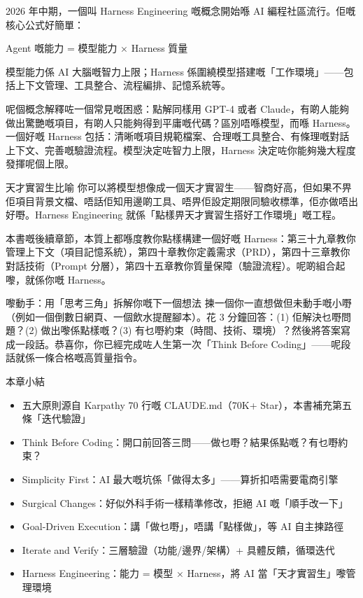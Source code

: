 
2026 年中期，一個叫 Harness Engineering 嘅概念開始喺 AI 編程社區流行。佢嘅核心公式好簡單：

Agent 嘅能力 = 模型能力 × Harness 質量

模型能力係 AI 大腦嘅智力上限；Harness 係圍繞模型搭建嘅「工作環境」——包括上下文管理、工具整合、流程編排、記憶系統等。

呢個概念解釋咗一個常見嘅困惑：點解同樣用 GPT-4 或者 Claude，有啲人能夠做出驚艷嘅項目，有啲人只能夠得到平庸嘅代碼？區別唔喺模型，而喺 Harness。一個好嘅 Harness 包括：清晰嘅項目規範檔案、合理嘅工具整合、有條理嘅對話上下文、完善嘅驗證流程。模型決定咗智力上限，Harness 決定咗你能夠幾大程度發揮呢個上限。

\begin{tcbinfo}{天才實習生比喻}
你可以將模型想像成一個天才實習生——智商好高，但如果不畀佢項目背景文檔、唔話佢知用邊啲工具、唔畀佢設定期限同驗收標準，佢亦做唔出好嘢。Harness Engineering 就係「點樣畀天才實習生搭好工作環境」嘅工程。

\end{tcbinfo}

本書嘅後續章節，本質上都喺度教你點樣構建一個好嘅 Harness：第三十九章教你管理上下文（項目記憶系統），第四十章教你定義需求（PRD），第四十三章教你對話技術（Prompt 分層），第四十五章教你質量保障（驗證流程）。呢啲組合起嚟，就係你嘅 Harness。

\begin{tcbpractice}{嚟動手：用「思考三角」拆解你嘅下一個想法}
揀一個你一直想做但未動手嘅小嘢（例如一個倒數日網頁、一個飲水提醒腳本）。花 3 分鐘回答：(1) 佢解決乜嘢問題？(2) 做出嚟係點樣嘅？(3) 有乜嘢約束（時間、技術、環境）？然後將答案寫成一段話。恭喜你，你已經完成咗人生第一次「Think Before Coding」——呢段話就係一條合格嘅高質量指令。

\end{tcbpractice}

\begin{tcbsummary}{本章小結}
\begin{itemize}
  \item 五大原則源自 Karpathy 70 行嘅 CLAUDE.md（70K+ Star），本書補充第五條「迭代驗證」
  \item Think Before Coding：開口前回答三問——做乜嘢？結果係點嘅？有乜嘢約束？
  \item Simplicity First：AI 最大嘅坑係「做得太多」——算折扣唔需要電商引擎
  \item Surgical Changes：好似外科手術一樣精準修改，拒絕 AI 嘅「順手改一下」
  \item Goal-Driven Execution：講「做乜嘢」，唔講「點樣做」，等 AI 自主揀路徑
  \item Iterate and Verify：三層驗證（功能/邊界/架構）+ 具體反饋，循環迭代
  \item Harness Engineering：能力 = 模型 × Harness，將 AI 當「天才實習生」嚟管理環境
\end{itemize}

\end{tcbsummary}
